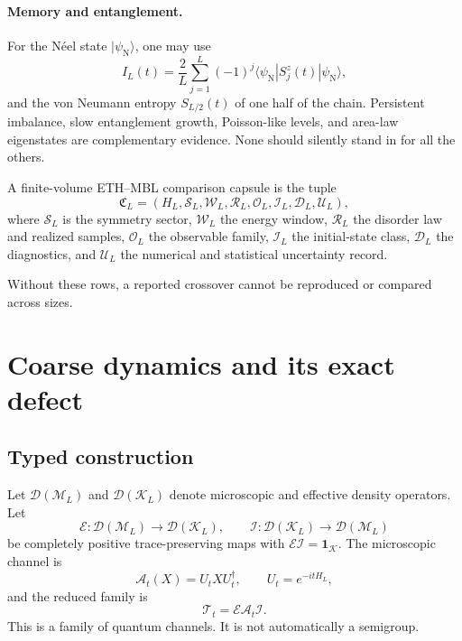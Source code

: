 \documentclass[11pt]{article}
\newcommand{\Dens}{\mathcal D}
\newcommand{\Obs}{\mathcal O}
\newcommand{\Micro}{\mathcal M}
\newcommand{\Eff}{\mathcal K}
\newcommand{\EE}{\mathcal E}
\newcommand{\II}{\mathcal I}
\newcommand{\Dyn}{\mathcal A}
\newcommand{\TT}{\mathcal T}
\newcommand{\id}{\mathbf 1}
\begin{document}
\paragraph{Memory and entanglement.}
For the N\'eel state $|\psi_{\mathrm N}\rangle$, one may use
\begin{equation}\label{eq:imbalance}
 I_L(t)=\frac{2}{L}\sum_{j=1}^{L}(-1)^j
 \langle\psi_{\mathrm N}|S_j^z(t)|\psi_{\mathrm N}\rangle ,
\end{equation}
and the von Neumann entropy $S_{L/2}(t)$ of one half of the chain.
Persistent imbalance, slow entanglement growth, Poisson-like levels, and
area-law eigenstates are complementary evidence.  None should silently
stand in for all the others.

\begin{definition}\label{def:capsule}
A finite-volume ETH--MBL comparison capsule is the tuple
\[
 \mathfrak C_L=(H_L,\mathcal S_L,\mathcal W_L,\mathcal R_L,
 \Obs_L,\mathcal I_L,\mathcal D_L,\mathcal U_L),
\]
where $\mathcal S_L$ is the symmetry sector, $\mathcal W_L$ the energy
window, $\mathcal R_L$ the disorder law and realized samples,
$\Obs_L$ the observable family, $\mathcal I_L$ the initial-state class,
$\mathcal D_L$ the diagnostics, and $\mathcal U_L$ the numerical and
statistical uncertainty record.
\end{definition}

Without these rows, a reported crossover cannot be reproduced or compared
across sizes.

\section{Coarse dynamics and its exact defect}

\subsection{Typed construction}

Let $\Dens(\Micro_L)$ and $\Dens(\Eff_L)$ denote microscopic and effective
density operators.  Let
\[
 \EE:\Dens(\Micro_L)\to\Dens(\Eff_L),\qquad
 \II:\Dens(\Eff_L)\to\Dens(\Micro_L)
\]
be completely positive trace-preserving maps with
$\EE\II=\id_{\Eff}$.  The microscopic channel is
\[
 \Dyn_t(X)=U_tXU_t^\dagger,\qquad U_t=e^{-itH_L},
\]
and the reduced family is
\begin{equation}\label{eq:reduced}
 \TT_t=\EE\Dyn_t\II .
\end{equation}
This is a family of quantum channels.  It is not automatically a
semigroup.
\end{document}
